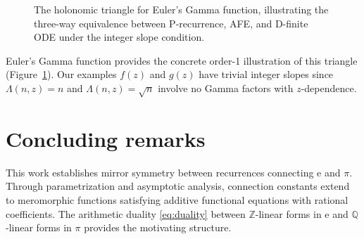 \documentclass[11pt,reqno]{amsart}
\theoremstyle{definition}
\newcommand{\Z}{\mathbb{Z}}
\newcommand{\Q}{\mathbb{Q}}
\newcommand{\ee}{\mathrm{e}}
\numberwithin{equation}{section}
\begin{document}
\begin{figure}[ht]
\centering
{}
\vspace{0.5em}
\caption{The holonomic triangle for Euler's Gamma function, illustrating the three-way equivalence between P-recurrence, AFE, and D-finite ODE under the integer slope condition.}
\label{fig:gamma-triangle}
\end{figure}

Euler's Gamma function provides the concrete order-1 illustration of this triangle (Figure~\ref{fig:gamma-triangle}). Our examples $f(z)$ and $g(z)$ have trivial integer slopes since $\Lambda(n,z) = n$ and $\Lambda(n,z) = \sqrt{n}$ involve no Gamma factors with $z$-dependence.

\section{Concluding remarks}

This work establishes mirror symmetry between recurrences connecting $\ee$ and $\pi$. Through parametrization and asymptotic analysis, connection constants extend to meromorphic functions satisfying additive functional equations with rational coefficients. The arithmetic duality \eqref{eq:duality} between $\Z$-linear forms in $\ee$ and $\Q$-linear forms in $\pi$ provides the motivating structure.
\end{document}
